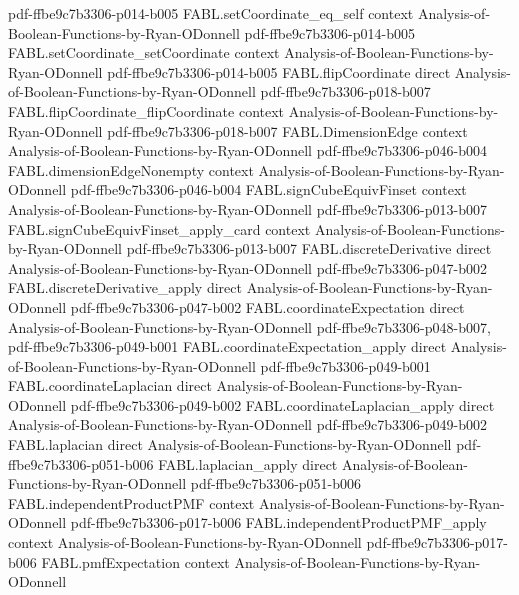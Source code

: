 \begin{theorem}
  {pdf-ffbe9c7b3306-p014-b005}
\proofstep
  {FABL.setCoordinate_eq_self}
  {context}
  {Analysis-of-Boolean-Functions-by-Ryan-ODonnell}
  {pdf-ffbe9c7b3306-p014-b005}
\proofstep
  {FABL.setCoordinate_setCoordinate}
  {context}
  {Analysis-of-Boolean-Functions-by-Ryan-ODonnell}
  {pdf-ffbe9c7b3306-p014-b005}
\proofstep
  {FABL.flipCoordinate}
  {direct}
  {Analysis-of-Boolean-Functions-by-Ryan-ODonnell}
  {pdf-ffbe9c7b3306-p018-b007}
\proofstep
  {FABL.flipCoordinate_flipCoordinate}
  {context}
  {Analysis-of-Boolean-Functions-by-Ryan-ODonnell}
  {pdf-ffbe9c7b3306-p018-b007}
\proofstep
  {FABL.DimensionEdge}
  {context}
  {Analysis-of-Boolean-Functions-by-Ryan-ODonnell}
  {pdf-ffbe9c7b3306-p046-b004}
\proofstep
  {FABL.dimensionEdgeNonempty}
  {context}
  {Analysis-of-Boolean-Functions-by-Ryan-ODonnell}
  {pdf-ffbe9c7b3306-p046-b004}
\proofstep
  {FABL.signCubeEquivFinset}
  {context}
  {Analysis-of-Boolean-Functions-by-Ryan-ODonnell}
  {pdf-ffbe9c7b3306-p013-b007}
\proofstep
  {FABL.signCubeEquivFinset_apply_card}
  {context}
  {Analysis-of-Boolean-Functions-by-Ryan-ODonnell}
  {pdf-ffbe9c7b3306-p013-b007}
\proofstep
  {FABL.discreteDerivative}
  {direct}
  {Analysis-of-Boolean-Functions-by-Ryan-ODonnell}
  {pdf-ffbe9c7b3306-p047-b002}
\proofstep
  {FABL.discreteDerivative_apply}
  {direct}
  {Analysis-of-Boolean-Functions-by-Ryan-ODonnell}
  {pdf-ffbe9c7b3306-p047-b002}
\proofstep
  {FABL.coordinateExpectation}
  {direct}
  {Analysis-of-Boolean-Functions-by-Ryan-ODonnell}
  {pdf-ffbe9c7b3306-p048-b007,
    pdf-ffbe9c7b3306-p049-b001}
\proofstep
  {FABL.coordinateExpectation_apply}
  {direct}
  {Analysis-of-Boolean-Functions-by-Ryan-ODonnell}
  {pdf-ffbe9c7b3306-p049-b001}
\proofstep
  {FABL.coordinateLaplacian}
  {direct}
  {Analysis-of-Boolean-Functions-by-Ryan-ODonnell}
  {pdf-ffbe9c7b3306-p049-b002}
\proofstep
  {FABL.coordinateLaplacian_apply}
  {direct}
  {Analysis-of-Boolean-Functions-by-Ryan-ODonnell}
  {pdf-ffbe9c7b3306-p049-b002}
\proofstep
  {FABL.laplacian}
  {direct}
  {Analysis-of-Boolean-Functions-by-Ryan-ODonnell}
  {pdf-ffbe9c7b3306-p051-b006}
\proofstep
  {FABL.laplacian_apply}
  {direct}
  {Analysis-of-Boolean-Functions-by-Ryan-ODonnell}
  {pdf-ffbe9c7b3306-p051-b006}
\proofstep
  {FABL.independentProductPMF}
  {context}
  {Analysis-of-Boolean-Functions-by-Ryan-ODonnell}
  {pdf-ffbe9c7b3306-p017-b006}
\proofstep
  {FABL.independentProductPMF_apply}
  {context}
  {Analysis-of-Boolean-Functions-by-Ryan-ODonnell}
  {pdf-ffbe9c7b3306-p017-b006}
\proofstep
  {FABL.pmfExpectation}
  {context}
  {Analysis-of-Boolean-Functions-by-Ryan-ODonnell}

\end{theorem}
